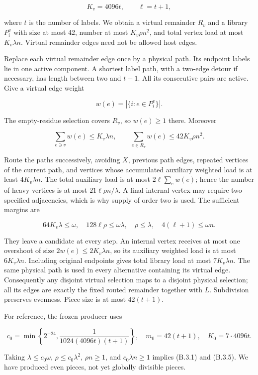 \documentclass[english,11pt,a4paper]{article}
\begin{document}
\[K_v=4096t,\qquad \ell=t+1,\]

where \(t\) is the number of labels. We obtain a virtual remainder \(R_v\) and a library \(P_i^v\) with size at most 42, number at most \(K_v\rho n^2\), and total vertex load at most \(K_v\lambda n\). Virtual remainder edges need not be allowed host edges.

Replace each virtual remainder edge once by a physical path. Its endpoint labels lie in one active component. A shortest label path, with a two-edge detour if necessary, has length between two and \(t+1\). All its consecutive pairs are active. Give a virtual edge weight

\[w(e)=|\{i:e\in P_i^v\}|.
\tag{B.3.3}\]

The empty-residue selection covers \(R_v\), so \(w(e)\ge1\) there. Moreover

\[\sum_{e\ni v}w(e)\le K_v\lambda n,
\qquad \sum_{e\in R_v}w(e)\le42K_v\rho n^2.
\tag{B.3.4}\]

Route the paths successively, avoiding \(X\), previous path edges, repeated vertices of the current path, and vertices whose accumulated auxiliary weighted load is at least \(4K_v\lambda n\). The total auxiliary load is at most \(2\ell\sum_e w(e)\); hence the number of heavy vertices is at most \(21\ell\rho n/\lambda\). A final internal vertex may require two specified adjacencies, which is why supply of order two is used. The sufficient margins are

\[64K_v\lambda\le\omega,\quad
128\ell\rho\le\omega\lambda,\quad
\rho\le\lambda,\quad4(\ell+1)\le\omega n.
\tag{B.3.5}\]

They leave a candidate at every step. An internal vertex receives at most one overshoot of size \(2w(e)\le2K_v\lambda n\), so its auxiliary weighted load is at most \(6K_v\lambda n\). Including original endpoints gives total library load at most \(7K_v\lambda n\). The same physical path is used in every alternative containing its virtual edge. Consequently any disjoint virtual selection maps to a disjoint physical selection; all its edges are exactly the fixed routed remainder together with \(L\). Subdivision preserves evenness. Piece size is at most \(42(t+1)\).

For reference, the frozen producer uses

\[c_0=\min\left\{2^{-24},\frac1{1024(4096t)(t+1)}\right\},\quad
m_0=42(t+1),\quad K_0=7\cdot4096t.
\tag{B.3.6}\]

Taking \(\lambda\le c_0\omega\), \(\rho\le c_0\lambda^2\), \(\rho n\ge1\), and \(c_0\lambda n\ge1\) implies (B.3.1) and (B.3.5). We have produced even pieces, not yet globally divisible pieces.
\end{document}
